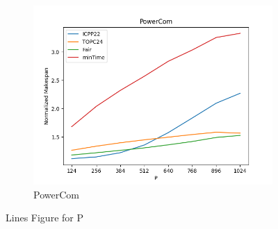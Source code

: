 \documentclass{article}
\begin{document}
\begin{figure}[htbp]
\begin{subfigure}[b]{0.32\textwidth}\includegraphics[width=\textwidth]{Results/P/P_PowerCom}\caption{PowerCom}\label{fig:lines_figures_P_PowerCom}\end{subfigure}
\hfill
\caption{Lines Figure for P}
\label{fig:lines_figures_P}
\end{figure}
\end{document}
